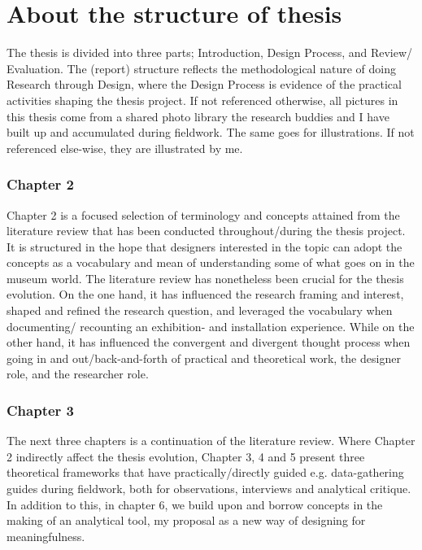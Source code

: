 \section{About the structure of thesis}
The thesis is divided into three parts; Introduction, Design Process, and Review/ Evaluation. The (report) structure reflects the methodological nature of doing Research through Design, where the Design Process is evidence of the practical activities shaping the thesis project. If not referenced otherwise, all pictures in this thesis come from a shared photo library the research buddies and I have built up and accumulated during fieldwork. The same goes for illustrations. If not referenced else-wise, they are illustrated by me.

\subsubsection{Chapter 2}
Chapter 2 is a focused selection of terminology and concepts attained from the literature review that has been conducted throughout/during the thesis project. It is structured in the hope that designers interested in the topic can adopt the concepts as a vocabulary and mean of understanding some of what goes on in the museum world. The literature review has nonetheless been crucial for the thesis evolution. On the one hand, it has influenced the research framing and interest, shaped and refined the research question, and leveraged the vocabulary when documenting/ recounting an exhibition- and installation experience. While on the other hand, it has influenced the convergent and divergent thought process when going in and out/back-and-forth of practical and theoretical work, the designer role, and the researcher role.


\subsubsection{Chapter 3}
The next three chapters is a continuation of the literature review. Where Chapter 2 indirectly affect the thesis evolution, Chapter 3, 4 and 5 present three theoretical frameworks that have practically/directly guided e.g. data-gathering guides during fieldwork, both for observations, interviews and analytical critique. In addition to this, in chapter 6, we build upon and borrow concepts in the making of an analytical tool, my proposal as a new way of designing for meaningfulness.

